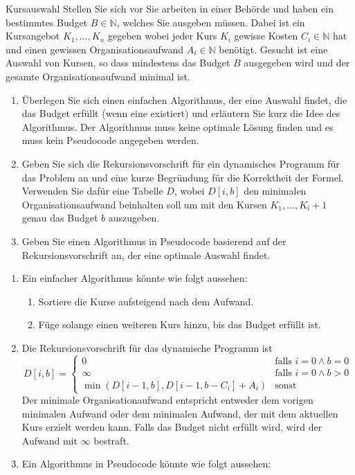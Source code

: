 \documentclass{article}
\begin{document}
\begin{exercise}{Kursauswahl}
  Stellen Sie sich vor Sie arbeiten in einer Behörde und haben ein bestimmtes Budget $B \in \mathbb{N}$, welches Sie ausgeben müssen. Dabei ist ein Kursangebot $K_1, \ldots, K_n$ gegeben wobei jeder Kurs $K_i$ gewisse Kosten $C_i \in \mathbb{N}$ hat und einen gewissen Organisationsaufwand $A_i \in \mathbb{N}$ benötigt. Gesucht ist eine Auswahl von Kursen, so dass mindestens das Budget $B$ ausgegeben wird und der gesamte Organisationsaufwand minimal ist.
  \begin{enumerate}
    \item Überlegen Sie sich einen einfachen Algorithmus, der eine Auswahl findet, die das Budget erfüllt (wenn eine existiert) und erläutern Sie kurz die Idee des Algorithmus. Der Algorithmus muss keine optimale Lösung finden und es muss kein Pseudocode angegeben werden.
    \item Geben Sie sich die Rekursionsvorschrift für ein dynamisches Programm für das Problem an und eine kurze Begründung für die Korrektheit der Formel. Verwenden Sie dafür eine Tabelle $D$, wobei $D[i, b]$ den minimalen Organisationsaufwand beinhalten soll um mit den Kursen $K_1, \ldots, K_i+1$ genau das Budget $b$ auszugeben.
    \item Geben Sie einen Algorithmus in Pseudocode basierend auf der Rekursionsvorschrift an, der eine optimale Auswahl findet.
  \end{enumerate}

  \begin{solution}
    \begin{enumerate}
      \item Ein einfacher Algorithmus könnte wie folgt aussehen:
            \begin{enumerate}
              \item Sortiere die Kurse aufsteigend nach dem Aufwand.
              \item Füge solange einen weiteren Kurs hinzu, bis das Budget erfüllt ist.
            \end{enumerate}
      \item Die Rekursionsvorschrift für das dynamische Programm ist\[
              D[i, b] = \begin{cases}
                0                                  & \text{falls } i=0 \land b=0 \\
                \infty                             & \text{falls } i=0 \land b>0 \\
                \min(D[i-1, b], D[i-1, b-C_i]+A_i) & \text{sonst}
              \end{cases}
            \] Der minimale Organisationaufwand entspricht entweder dem vorigen minimalen Aufwand oder dem minimalen Aufwand, der mit dem aktuellen Kurs erzielt werden kann. Falls das Budget nicht erfüllt wird, wird der Aufwand mit $\infty$ bestraft.
      \item Ein Algorithmus in Pseudocode könnte wie folgt aussehen:\par
    \end{enumerate}
  \end{solution}
\end{exercise}
\end{document}
